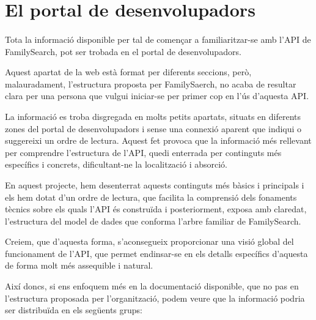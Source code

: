 \section{El portal de desenvolupadors}

    \paragraph{}
    Tota la informació disponible per tal de començar a familiaritzar-se amb l’\gls{API} de FamilySearch, pot ser trobada en el portal de desenvolupadors.

    Aquest apartat de la web està format per diferents seccions, però, malauradament, l’estructura proposta per FamilySaerch, no acaba de resultar clara per una persona que vulgui iniciar-se per primer cop en l'ús d'aquesta \gls{API}.

    La informació es troba disgregada en molts petits apartats, situats en diferents zones del portal de desenvolupadors i sense una connexió aparent que indiqui o suggereixi un ordre de lectura. Aquest fet provoca que la informació més rellevant per comprendre l'estructura de l'API, quedi enterrada per continguts més específics i concrets, dificultant-ne la localització i absorció.

    En aquest projecte, hem desenterrat aquests continguts més bàsics i principals i els hem dotat d'un ordre de lectura, que facilita la comprensió dels fonaments tècnics sobre els quals l'API és construïda i posteriorment, exposa amb claredat, l'estructura del model de dades que conforma l'arbre familiar de FamilySearch.

    Creiem, que d'aquesta forma, s'aconsegueix proporcionar una visió global del funcionament de l'API, que permet endinsar-se en els detalls específics d'aquesta de forma molt més assequible i natural.

    Així doncs, si ens enfoquem més en la documentació disponible, que no pas en l'estructura proposada per l’organització, podem veure que la informació podria ser distribuïda en els següents grups:

